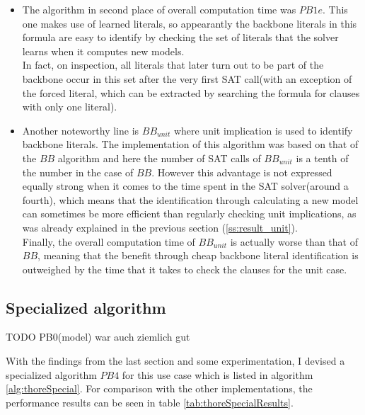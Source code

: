 \begin{itemize}
\item The algorithm in second place of overall computation time was $PB1e$. This one makes use of learned literals, so appearantly the backbone literals in this formula are easy to identify by checking the set of literals that the solver learns when it computes new models.\\
In fact, on inspection, all literals that later turn out to be part of the backbone occur in this set after the very first SAT call(with an exception of the forced literal, which can be extracted by searching the formula for clauses with only one literal).
\item Another noteworthy line is $BB_{unit}$ where unit implication is used to identify backbone literals. The implementation of this algorithm was based on that of the $BB$ algorithm and here the number of SAT calls of $BB_{unit}$ is a tenth of the number in the case of $BB$. However this advantage is not expressed equally strong when it comes to the time spent in the SAT solver(around a fourth), which means that the identification through calculating a new model can sometimes be more efficient than regularly checking unit implications, as was already explained in the previous section (\ref{ss:result_unit}).\\
Finally, the overall computation time of $BB_{unit}$ is actually worse than that of $BB$, meaning that the benefit through cheap backbone literal identification is outweighed by the time that it takes to check the clauses for the unit case. 
\end{itemize}

\subsection{Specialized algorithm}
TODO PB0(model) war auch ziemlich gut

With the findings from the last section and some experimentation, I devised a specialized algorithm $PB4$ for this use case which is listed in algorithm \ref{alg:thoreSpecial}. For comparison with the other implementations, the performance results can be seen in table \ref{tab:thoreSpecialResults}.

